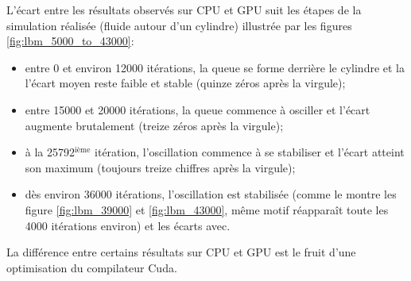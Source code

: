 L'écart entre les résultats observés sur \ac{CPU} et \ac{GPU} suit les étapes de la simulation réalisée (fluide autour d'un cylindre) illustrée par les figures \ref{fig:lbm_5000_to_43000}:
\begin{itemize}
\item entre 0 et environ 12000 itérations, la queue se forme derrière le cylindre et la l'écart moyen reste faible et stable (quinze zéros après la virgule);
\item entre 15000 et 20000 itérations, la queue commence à osciller et l'écart augmente brutalement (treize zéros après la virgule);
\item à la 25792$^{\textrm{ième}}$ itération, l'oscillation commence à se stabiliser et l'écart atteint son maximum (toujours treize chiffres après la virgule);
\item dès environ 36000 itérations, l'oscillation est stabilisée (comme le montre les figure \ref{fig:lbm_39000} et \ref{fig:lbm_43000}, même motif réapparaît toute les 4000 itérations environ) et les écarts avec.
\end{itemize}

La différence entre certains résultats sur \ac{CPU} et \ac{GPU} est le fruit d'une optimisation du compilateur Cuda. 

